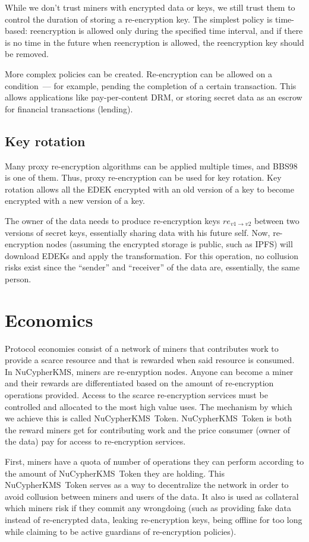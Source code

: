 \documentclass[notitlepage,longbibliography]{revtex4-1}
\newcommand{\kms}{NuCypherKMS}
\begin{document}
While we don't trust miners with encrypted data or keys, we still trust them to control the duration of storing a re-encryption key.
The simplest policy is time-based: reencryption is allowed only during the specified time interval, and if there is no time in the future when
reencryption is allowed, the reencryption key should be removed.

More complex policies can be created.
Re-encryption can be allowed on a condition~--- for example, pending the completion of a certain transaction.
This allows applications like pay-per-content DRM, or storing secret data as an escrow for financial transactions (lending).

\subsection{Key rotation}

Many proxy re-encryption algorithms can be applied multiple times, and BBS98~\cite{BBS98} is one of them.
Thus, proxy re-encryption can be used for key rotation.
Key rotation allows all the EDEK encrypted with an old version of a key to become encrypted with a new version of a key.

The owner of the data needs to produce re-encryption keys $re_{v1\rightarrow v2}$ between two versions of secret keys, essentially
sharing data with his future self.
Now, re-encryption nodes (assuming the encrypted storage is public, such as IPFS) will download EDEKs and apply the transformation.
For this operation, no collusion risks exist since the ``sender'' and ``receiver'' of the data are, essentially, the same person.

\section{Economics}
Protocol economies consist of a network of miners that contributes work to provide a scarce resource and that is
rewarded when said resource is consumed.
In \kms, miners are re-enryption nodes.
Anyone can become a miner and their rewards are differentiated based on the amount of re-encryption operations provided.
Access to the scarce re-encryption services must be controlled and allocated to the most high value uses.
The mechanism by which we achieve this is called \kms~Token. \kms~Token is both the reward miners get for contributing
work and the price consumer (owner of the data) pay for access to re-encryption services.

First, miners have a quota of number of operations they can perform according to the amount of \kms~Token they are holding.
This \kms~Token serves as a way to decentralize the network in order to avoid collusion between miners and users of the data.
It also is used as collateral which miners risk if they commit any wrongdoing (such as providing fake data instead of re-encrypted data, leaking
re-encryption keys, being offline for too long while claiming to be active guardians of re-encryption policies).
\end{document}

